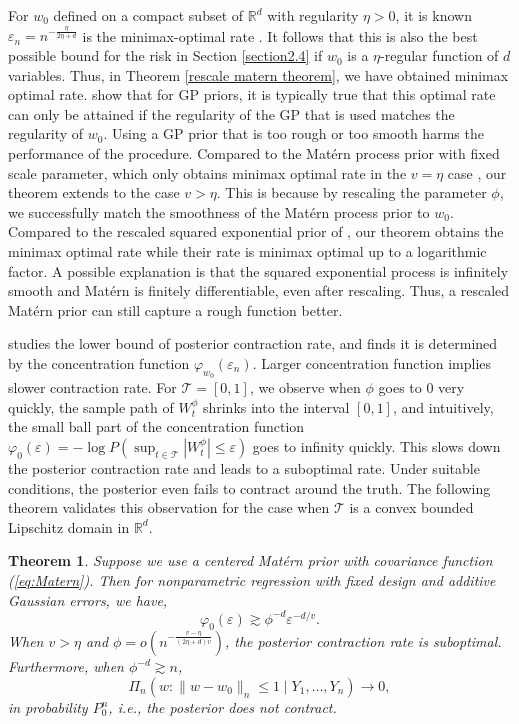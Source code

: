 \documentclass[ejs,noshowframe]{imsart}
\theoremstyle{plain}
\newtheorem{theorem}{Theorem}[section]
\theoremstyle{definition}
\theoremstyle{remark}
\begin{document}
For $w_0$  defined on a compact subset of $\mathbb{R}^d $ with regularity $\eta> 0$, it is known $\varepsilon_n = n^{-\frac{\eta}{2 \eta+d}}$ is the minimax-optimal rate \citep{tsybakov2009introduction,stone1980optimal}. It follows that this is also the best possible bound for the risk in Section \ref{section2.4} if $w_0$ is a $\eta$-regular function of $d$ variables. Thus, in Theorem \ref{rescale matern theorem}, we have obtained minimax optimal rate.  \cite{van2008rates} show that for GP priors, it is typically true that
this optimal rate can only be attained if the regularity of the GP that is used matches the regularity
of $w_0$. Using a GP prior that is too rough or too smooth
harms the performance of the procedure. Compared to the Mat\'ern process prior with fixed scale parameter, which only obtains minimax optimal rate in the $v=\eta$ case \citep{van2011information}, our theorem extends to the case $v> \eta$. This is because by rescaling the parameter $\phi$, we successfully match the smoothness of  the Mat\'ern process prior to  $w_0$. Compared to the rescaled squared exponential  prior of \cite{van2007bayesian}, our theorem obtains the minimax optimal rate while their rate is   minimax optimal up to a logarithmic factor. A possible explanation is that the squared exponential process is infinitely smooth and Mat\'ern is finitely differentiable, even after rescaling. Thus, a rescaled Mat\'ern  prior can still capture a rough function better.

\cite{castillo2008lower} studies the lower bound of posterior contraction rate, and  finds it is determined by the concentration function $\varphi_{w_0}(\varepsilon_n)$. Larger concentration function implies slower contraction rate. For  $\mathcal{T}=[0,1]$, we  observe  when $\phi$ goes to $0$ very quickly, the sample path of $W_t^\phi$ shrinks into the interval $[0,1]$, and intuitively,  the small ball part of the concentration function
$\varphi_0(\varepsilon) = - \log P(\sup_{t \in \mathcal{T}} |W_t^\phi| \le \varepsilon)$ 
goes to infinity quickly. This slows down the posterior contraction rate and leads to a suboptimal rate. Under suitable conditions, the posterior even  fails to contract around the truth. The following theorem validates this observation for  the case when $\mathcal{T}$ is a convex bounded Lipschitz domain in $\mathbb{R}^d$.
\begin{theorem}
Suppose we use a centered Mat\'ern prior  with  covariance function  (\ref{eq:Matern}).  Then  for nonparametric regression with fixed design and additive Gaussian errors, we have,
$$
  \varphi_0(\varepsilon )\gtrsim \phi^{-d} \varepsilon^{-d/v}. 
$$
When $v > \eta$ and $\phi = o(n^{-\frac{v-\eta}{(2\eta+d)v}})$, the posterior contraction rate is suboptimal. Furthermore, when $\phi^{-d} \gtrsim n$, 
$$
 \Pi_n(w:\|w-w_0\|_n \leq 1 \mid Y_1,\ldots,Y_n)  \to 0,
$$
in probability $P_0^n$, i.e., the posterior does not contract.
\label{lower bound of rescaled matern}
\end{theorem}
   
\end{document}
